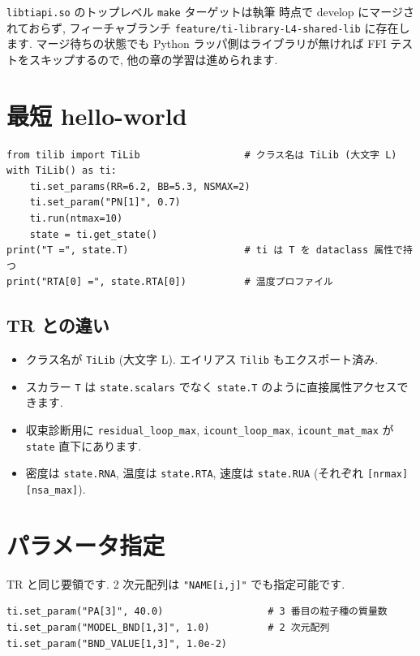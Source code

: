 \documentclass[11pt,a4paper]{report}
\begin{document}
\begin{warn}
\texttt{libtiapi.so} のトップレベル \texttt{make} ターゲットは執筆
時点で develop にマージされておらず, フィーチャブランチ
\texttt{feature/ti-library-L4-shared-lib} に存在します.
マージ待ちの状態でも Python ラッパ側はライブラリが無ければ
FFI テストをスキップするので, 他の章の学習は進められます.
\end{warn}

\section{最短 hello-world}

\begin{lstlisting}[style=py]
from tilib import TiLib                  # クラス名は TiLib (大文字 L)
with TiLib() as ti:
    ti.set_params(RR=6.2, BB=5.3, NSMAX=2)
    ti.set_param("PN[1]", 0.7)
    ti.run(ntmax=10)
    state = ti.get_state()
print("T =", state.T)                    # ti は T を dataclass 属性で持つ
print("RTA[0] =", state.RTA[0])          # 温度プロファイル
\end{lstlisting}

\subsection*{TR との違い}

\begin{itemize}[leftmargin=1.5em]
  \item クラス名が \texttt{TiLib} (大文字 L). エイリアス
        \texttt{Tilib} もエクスポート済み.
  \item スカラー \texttt{T} は \texttt{state.scalars} でなく
        \texttt{state.T} のように直接属性アクセスできます.
  \item 収束診断用に \texttt{residual\_loop\_max},
        \texttt{icount\_loop\_max}, \texttt{icount\_mat\_max} が
        \texttt{state} 直下にあります.
  \item 密度は \texttt{state.RNA}, 温度は \texttt{state.RTA}, 速度は
        \texttt{state.RUA} (それぞれ \texttt{[nrmax][nsa\_max]}).
\end{itemize}

\section{パラメータ指定}

TR と同じ要領です. 2 次元配列は \texttt{"NAME[i,j]"} でも指定可能です.

\begin{lstlisting}[style=py]
ti.set_param("PA[3]", 40.0)                  # 3 番目の粒子種の質量数
ti.set_param("MODEL_BND[1,3]", 1.0)          # 2 次元配列
ti.set_param("BND_VALUE[1,3]", 1.0e-2)
\end{lstlisting}
\end{document}
